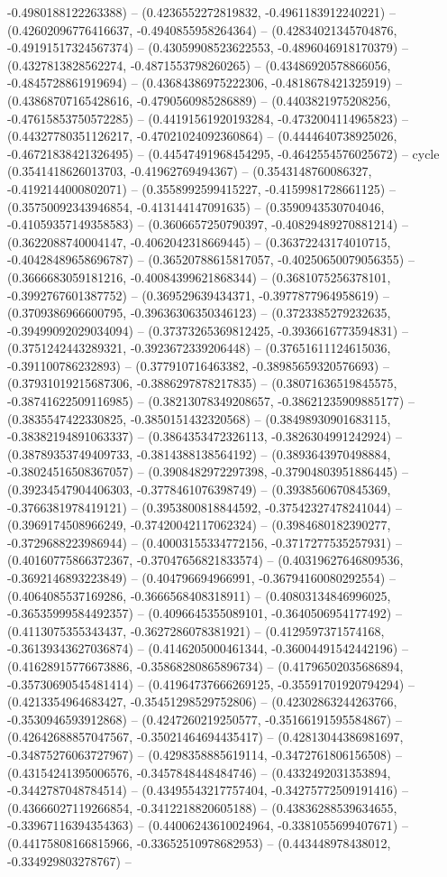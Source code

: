 -0.4980188122263388) -- (0.4236552272819832, -0.4961183912240221) -- (0.42602096776416637, -0.4940855958264364) -- (0.42834021345704876, -0.49191517324567374) -- (0.43059908523622553, -0.4896046918170379) -- (0.4327813828562274, -0.4871553798260265) -- (0.43486920578866056, -0.4845728861919694) -- (0.43684386975222306, -0.4818678421325919) -- (0.43868707165428616, -0.4790560985286889) -- (0.4403821975208256, -0.47615853750572285) -- (0.44191561920193284, -0.4732004114965823) -- (0.44327780351126217, -0.47021024092360864) -- (0.4444640738925026, -0.46721838421326495) -- (0.44547491968454295, -0.4642554576025672) -- cycle
	(0.3541418626013703, -0.41962769494367) -- (0.3543148760086327, -0.4192144000802071) -- (0.3558992599415227, -0.4159981728661125) -- (0.35750092343946854, -0.413144147091635) -- (0.3590943530704046, -0.41059357149358583) -- (0.3606657250790397, -0.40829489270881214) -- (0.3622088740004147, -0.4062042318669445) -- (0.36372243174010715, -0.40428489658696787) -- (0.36520788615817057, -0.40250650079056355) -- (0.3666683059181216, -0.40084399621868344) -- (0.3681075256378101, -0.3992767601387752) -- (0.369529639434371, -0.3977877964958619) -- (0.3709386966600795, -0.39636306350346123) -- (0.3723385279232635, -0.39499092029034094) -- (0.37373265369812425, -0.3936616773594831) -- (0.3751242443289321, -0.3923672339206448) -- (0.37651611124615036, -0.391100786232893) -- (0.377910716463382, -0.38985659320576693) -- (0.37931019215687306, -0.3886297878217835) -- (0.38071636519845575, -0.38741622509116985) -- (0.38213078349208657, -0.38621235909885177) -- (0.3835547422330825, -0.3850151432320568) -- (0.38498930901683115, -0.38382194891063337) -- (0.3864353472326113, -0.3826304991242924) -- (0.38789353749409733, -0.3814388138564192) -- (0.3893643970498884, -0.38024516508367057) -- (0.3908482972297398, -0.37904803951886445) -- (0.39234547904406303, -0.3778461076398749) -- (0.3938560670845369, -0.3766381978419121) -- (0.3953800818844592, -0.37542327478241044) -- (0.3969174508966249, -0.37420042117062324) -- (0.3984680182390277, -0.3729688223986944) -- (0.40003155334772156, -0.3717277535257931) -- (0.40160775866372367, -0.37047656821833574) -- (0.40319627646809536, -0.3692146893223849) -- (0.404796694966991, -0.36794160080292554) -- (0.4064085537169286, -0.3666568408318911) -- (0.40803134846996025, -0.36535999584492357) -- (0.4096645355089101, -0.3640506954177492) -- (0.4113075355343437, -0.3627286078381921) -- (0.4129597371574168, -0.36139343627036874) -- (0.4146205000461344, -0.36004491542442196) -- (0.41628915776673886, -0.35868280865896734) -- (0.41796502035686894, -0.35730690545481414) -- (0.41964737666269125, -0.35591701920794294) -- (0.4213354964683427, -0.35451298529752806) -- (0.42302863244263766, -0.3530946593912868) -- (0.4247260219250577, -0.35166191595584867) -- (0.42642688857047567, -0.35021464694435417) -- (0.42813044386981697, -0.34875276063727967) -- (0.4298358885619114, -0.3472761806156508) -- (0.43154241395006576, -0.3457848448484746) -- (0.4332492031353894, -0.3442787048784514) -- (0.43495543217757404, -0.34275772509191416) -- (0.43666027119266854, -0.3412218820605188) -- (0.43836288539634655, -0.33967116394354363) -- (0.44006243610024964, -0.3381055699407671) -- (0.44175808166815966, -0.33652510978682953) -- (0.443448978438012, -0.334929803278767) -- 